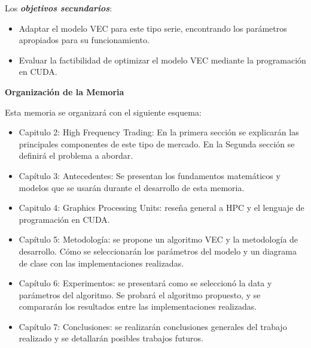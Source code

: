 \noindent Los \emph{\textbf{objetivos secundarios}}:
\begin{itemize}
	\item Adaptar el modelo VEC para este tipo serie, encontrando
los parámetros apropiados para su funcionamiento.
	\item Evaluar la factibilidad de optimizar el modelo VEC mediante la
programación en CUDA.
\end{itemize}


\noindent \textbf{Organización de la Memoria}

\noindent Esta memoria se organizará con el siguiente esquema:
\begin{itemize}
 \item Capitulo 2: High Frequency Trading: En la primera sección se
explicarán las principales componentes de este tipo de mercado. En la
Segunda sección se definirá el problema a abordar.
 \item Capítulo 3: Antecedentes: Se presentan los fundamentos matemáticos y
modelos que se usarán durante el desarrollo de esta memoria.
 \item Capitulo 4: Graphics Processing Units: reseña general a HPC y el 
lenguaje de programación en CUDA.
 \item Capítulo 5: Metodología: se propone un algoritmo VEC y la metodología de
desarrollo. Cómo se seleccionarán los parámetros del modelo y un diagrama de
clase con las implementaciones realizadas.
 \item Capítulo 6: Experimentos: se presentará como se seleccionó la data y
parámetros del algoritmo. Se probará el algoritmo propuesto, y se compararán
los resultados entre las implementaciones realizadas.
 \item Capítulo 7: Conclusiones: se realizarán conclusiones generales del
trabajo realizado y se detallarán posibles trabajos futuros.
\end{itemize}

